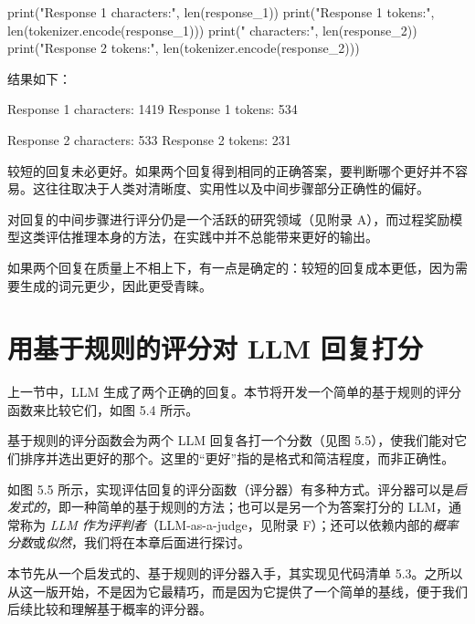 \begin{codebox}
print("Response 1 characters:", len(response_1))
print("Response 1 tokens:", len(tokenizer.encode(response_1)))
print(" characters:", len(response_2))
print("Response 2 tokens:", len(tokenizer.encode(response_2)))
\end{codebox}

结果如下：

\begin{codebox}
Response 1 characters: 1419
Response 1 tokens: 534

Response 2 characters: 533
Response 2 tokens: 231
\end{codebox}

较短的回复未必更好。如果两个回复得到相同的正确答案，要判断哪个更好并不容易。这往往取决于人类对清晰度、实用性以及中间步骤部分正确性的偏好。

对回复的中间步骤进行评分仍是一个活跃的研究领域（见附录 A），而过程奖励模型这类评估推理本身的方法，在实践中并不总能带来更好的输出。

如果两个回复在质量上不相上下，有一点是确定的：较短的回复成本更低，因为需要生成的词元更少，因此更受青睐。

\section{用基于规则的评分对 LLM 回复打分}

上一节中，LLM 生成了两个正确的回复。本节将开发一个简单的基于规则的评分函数来比较它们，如图 5.4 所示。


基于规则的评分函数会为两个 LLM 回复各打一个分数（见图 5.5），使我们能对它们排序并选出更好的那个。这里的“更好”指的是格式和简洁程度，而非正确性。


如图 5.5 所示，实现评估回复的评分函数（评分器）有多种方式。评分器可以是\emph{启发式的}，即一种简单的基于规则的方法；也可以是另一个为答案打分的 LLM，通常称为 \emph{LLM 作为评判者}（LLM-as-a-judge，见附录 F）；还可以依赖内部的\emph{概率分数}或\emph{似然}，我们将在本章后面进行探讨。

本节先从一个启发式的、基于规则的评分器入手，其实现见代码清单 5.3。之所以从这一版开始，不是因为它最精巧，而是因为它提供了一个简单的基线，便于我们后续比较和理解基于概率的评分器。

